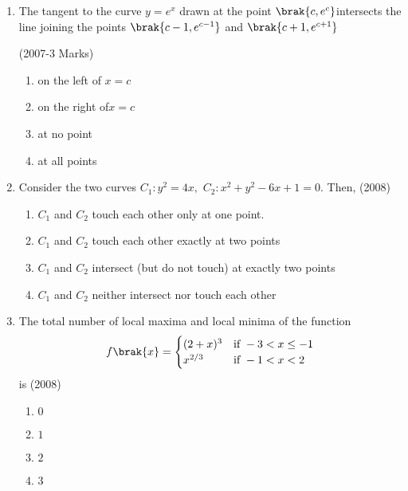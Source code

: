 \documentclass[journal,12pt,twocolumn]{IEEEtran}
\theoremstyle{remark}
\begin{document}
\begin{enumerate}
   
   
      \item 
 The tangent to the curve $y=e^x$ drawn at the point $\brak{c,e^c}$intersects the line joining the points $\brak{c-1,e^{c-1}}$ and $\brak{c+1,e^{c+1}}$
    
      \hfill(2007-3 Marks)
      \begin{enumerate}
       \item on the left of $x=c$
       \item on the right of$x=c$ 
       \item at no point  
       \item at all points\\
      \end{enumerate}

   
      \item
	      Consider the two curves $C_{1}:y^2=4x,$  $C_{2}:x^2+y^2-6x+1=0.$ Then,  \hfill(2008)
     \begin{enumerate}
      \item $C_{1}$ and $C_{2}$ touch each other only at one point.
    
      \item $C_{1}$ and $C_{2}$ touch each other exactly at two points

      \item $C_{1}$ and $C_{2}$ intersect (but do not touch) at exactly two points

      \item $C_{1}$ and $C_{2}$ neither intersect nor touch each other \\
     
    \end{enumerate}
 
    \item 
    The total number of local maxima and local minima of the function \\
    \begin{align*}
      f\brak{x}=
      \begin{cases} 
       (2+x)^3 & \text{if } -3<x\le -1\\
       x^{2/3} & \text{if } -1<x<2
      \end{cases}
    \end{align*}is
   \hfill(2008)
    \begin{enumerate}
     \item $0$ 
     \item $1$
     \item $2$ 
     \item $3$ \\
    \end{enumerate}   



\end{enumerate}
\end{document}
